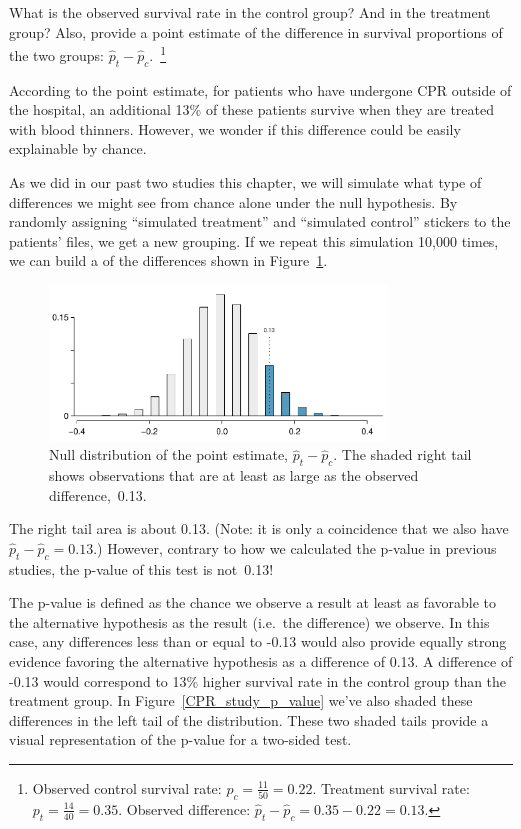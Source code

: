 \begin{exercise}
What is the observed survival rate in the control group? And in the treatment group? Also, provide a point estimate of the difference in survival proportions of the two groups: $\hat{p}_t - \hat{p}_c$.~\footnote{Observed control survival rate: $p_c = \frac{11}{50} = 0.22$. Treatment survival rate: $p_t = \frac{14}{40} = 0.35$. Observed difference: $\hat{p}_t - \hat{p}_c = 0.35 - 0.22 = 0.13$.}
\end{exercise}

According to the point estimate, for patients who have undergone CPR outside of the hospital, an additional 13\% of these patients survive when they are treated with blood thinners. However, we wonder if this difference could be easily explainable by chance.

As we did in our past two studies this chapter, we will simulate what type of differences we might see from chance alone under the null hypothesis. By randomly assigning ``simulated treatment'' and ``simulated control'' stickers to the patients' files, we get a new grouping. If we repeat this simulation 10,000 times, we can build a  of the differences shown in Figure~\ref{CPR_study_right_tail}.

\begin{figure}[ht]
\centering
\includegraphics[width=0.8\textwidth]{05/figures/CPR_study/CPR_study_right_tail}
\caption{Null distribution of the point estimate, $\hat{p}_t - \hat{p}_c$. The shaded right tail shows observations that are at least as large as the observed difference,~0.13.}
\label{CPR_study_right_tail}
\end{figure}

The right tail area is about 0.13. (Note: it is only a coincidence that we also have $\hat{p}_t - \hat{p}_c=0.13$.) However, contrary to how we calculated the p-value in previous studies, the p-value of this test is not~0.13!

The p-value is defined as the chance we observe a result at least as favorable to the alternative hypothesis as the result (i.e.~the difference) we observe. In this case, any differences less than or equal to -0.13 would also provide equally strong evidence favoring the alternative hypothesis as a difference of 0.13. A difference of -0.13 would correspond to 13\% higher survival rate in the control group than the treatment group. In Figure~\ref{CPR_study_p_value} we've also shaded these differences in the left tail of the distribution. These two shaded tails provide a visual representation of the p-value for a two-sided test.

